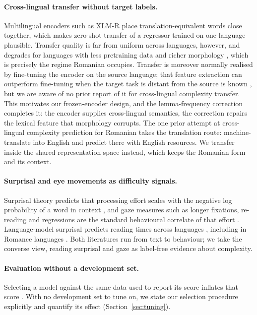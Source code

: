 \paragraph{Cross-lingual transfer without target labels.}
Multilingual encoders such as XLM-R \citep{conneau2020xlmr} place
translation-equivalent words close together, which makes zero-shot
transfer of a regressor trained on one language plausible. Transfer
quality is far from uniform across languages, however, and degrades for
languages with less pretraining data and richer morphology
\citep{pires-etal-2019-multilingual, wu-dredze-2020-languages}, which is
precisely the regime Romanian occupies. Transfer is moreover normally
realised by fine-tuning the encoder on the source language; that feature
extraction can outperform fine-tuning when the target task is distant
from the source is known \citep{peters-etal-2019-tune}, but we are aware
of no prior report of it for cross-lingual complexity transfer. This
motivates our frozen-encoder design, and the lemma-frequency correction
completes it: the encoder supplies cross-lingual semantics, the
correction repairs the lexical feature that morphology corrupts. The one
prior attempt at cross-lingual complexity prediction for Romanian takes
the translation route: \citet{cristea-nisioi-2024-machine}
machine-translate into English and predict there with English resources.
We transfer inside the shared representation space instead, which keeps
the Romanian form and its context.

\paragraph{Surprisal and eye movements as difficulty signals.}
Surprisal theory predicts that processing effort scales with the
negative log probability of a word in context \citep{hale2001probabilistic},
and gaze measures such as longer fixations, re-reading and regressions
are the standard behavioural correlate of that effort
\citep{rayner1998eye}. Language-model surprisal predicts reading times
across languages \citep{hollenstein-etal-2021-multilingual}, including
in Romance languages \citep{alves-2025-benchmarking}. Both literatures
run from text to behaviour; we take the converse view, reading surprisal
and gaze as label-free evidence about complexity.

\paragraph{Evaluation without a development set.}
Selecting a model against the same data used to report its score inflates
that score \citep{gorman-bedrick-2019-need}. With no development set to
tune on, we state our selection procedure explicitly and quantify its
effect (Section~\ref{sec:tuning}).

